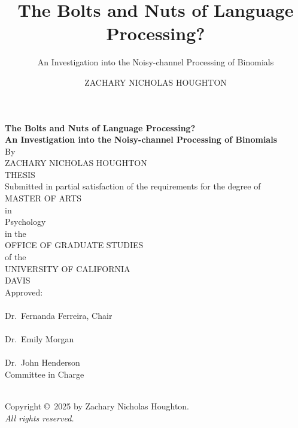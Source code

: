 \documentclass[
  12pt,
]{scrartcl}
\title{The Bolts and Nuts of Language Processing?}
\subtitle{An Investigation into the Noisy-channel Processing of
Binomials}
\author{ZACHARY NICHOLAS HOUGHTON}
\date{}
\begin{document}
\cleardoublepage
\thispagestyle{plain}
\begin{center}
   \null\vfill
   \textbf{%
      The Bolts and Nuts of Language Processing?\\
	  An Investigation into the Noisy-channel Processing of Binomials
   }%
   \\
   \bigskip
   By \\
   \bigskip
   {ZACHARY NICHOLAS HOUGHTON}
\\   
   THESIS \\
   \bigskip
   Submitted in partial satisfaction of the requirements for the
   degree of \\
   \bigskip
   MASTER OF ARTS \\
   \bigskip
   in \\
   \bigskip
   {Psychology} \\ 
      \bigskip
   in the \\
   \bigskip
   OFFICE OF GRADUATE STUDIES \\
   \bigskip        
   of the \\
   \bigskip
   UNIVERSITY OF CALIFORNIA \\
   \bigskip
   DAVIS \\
   \bigskip
   Approved: \\
   \bigskip
   \bigskip
   \makebox[3in]{\hrulefill} \\
   Dr.~Fernanda Ferreira, Chair \\
   \bigskip
   \bigskip
   \makebox[3in]{\hrulefill} \\
   Dr.~Emily Morgan \\
   \bigskip
   \bigskip
   \makebox[3in]{\hrulefill} \\
   Dr.~John Henderson \\
   \bigskip
   Committee in Charge \\
    \\
   \vfill
\end{center}


\newpage
{}
\setcounter{savedpage}{\value{page}}

\thispagestyle{empty}
\begin{titlepage}
\begin{center}
  Copyright \copyright\ 2025 by Zachary Nicholas Houghton. \\
  \textit{All rights reserved.}
\end{center}
\end{titlepage}
\end{document}
